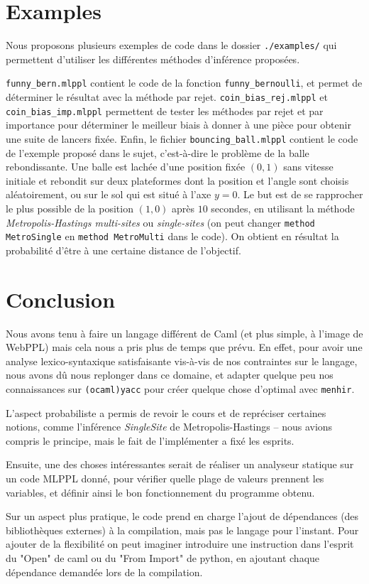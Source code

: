\documentclass[svgnames]{article}
\begin{document}
\section{Examples}

Nous proposons plusieurs exemples de code dans le dossier \verb|./examples/| qui permettent d'utiliser les différentes méthodes d'inférence proposées.

\verb|funny_bern.mlppl| contient le code de la fonction \verb|funny_bernoulli|, et permet de déterminer le résultat avec la méthode par rejet. \verb|coin_bias_rej.mlppl| et \verb|coin_bias_imp.mlppl| permettent de tester les méthodes par rejet et par importance pour déterminer le meilleur biais à donner à une pièce pour obtenir une suite de lancers fixée. Enfin, le fichier \verb|bouncing_ball.mlppl| contient le code de l'exemple proposé dans le sujet, c'est-à-dire le problème de la balle rebondissante. Une balle est lachée d'une position fixée $(0,1)$ sans vitesse initiale et rebondit sur deux plateformes dont la position et l'angle sont choisis aléatoirement, ou sur le sol qui est situé à l'axe $y=0$. Le but est de se rapprocher le plus possible de la position $(1,0)$ après $10$ secondes, en utilisant la méthode \emph{Metropolis-Hastings multi-sites} ou \emph{single-sites} (on peut changer \lstinline{method MetroSingle} en \lstinline{method MetroMulti} dans le code). On obtient en résultat la probabilité d'être à une certaine distance de l'objectif.

\section{Conclusion}
 
Nous avons tenu à faire un langage différent de Caml (et plus simple, à l'image de WebPPL) mais cela nous a pris plus de temps que prévu. En effet, pour avoir une analyse lexico-syntaxique satisfaisante vis-à-vis de nos contraintes sur le langage, nous avons dû nous replonger dans ce domaine, et adapter quelque peu nos connaissances sur  \verb|(ocaml)yacc| pour créer quelque chose d'optimal avec \verb|menhir|.

L'aspect probabiliste a permis de revoir le cours et de repréciser certaines notions, comme l'inférence \emph{SingleSite} de Metropolis-Hastings -- nous avions compris le principe, mais le fait de l'implémenter a fixé les esprits.

\bigskip

Ensuite, une des choses intéressantes serait de réaliser un analyseur statique sur un code MLPPL donné, pour vérifier quelle plage de valeurs prennent les variables, et définir ainsi le bon fonctionnement du programme obtenu.

Sur un aspect plus pratique, le code prend en charge l'ajout de dépendances (des bibliothèques externes) à la compilation, mais pas le langage pour l'instant. Pour ajouter de la flexibilité on peut imaginer introduire une instruction dans l'esprit du "Open" de caml ou du "From Import" de python, en ajoutant chaque dépendance demandée lors de la compilation.
\end{document}
